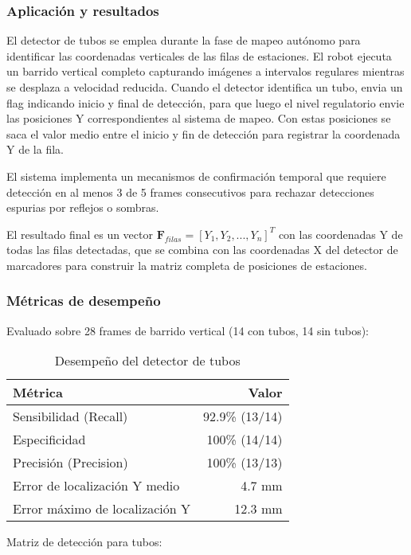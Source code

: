 \subsubsection{Aplicación y resultados}

El detector de tubos se emplea durante la fase de mapeo autónomo para identificar las coordenadas verticales de las filas de estaciones. El robot ejecuta un barrido vertical completo capturando imágenes a intervalos regulares mientras se desplaza a velocidad reducida. Cuando el detector identifica un tubo, envia un flag indicando inicio y final de detección, para que luego el nivel regulatorio envie las posiciones Y correspondientes al sistema de mapeo. Con estas posiciones se saca el valor medio entre el inicio y fin de detección para registrar la coordenada Y de la fila.

El sistema implementa un mecanismos de confirmación temporal que requiere detección en al menos 3 de 5 frames consecutivos para rechazar detecciones espurias por reflejos o sombras.

El resultado final es un vector $\mathbf{F}_{filas} = [Y_1, Y_2, ..., Y_n]^T$ con las coordenadas Y de todas las filas detectadas, que se combina con las coordenadas X del detector de marcadores para construir la matriz completa de posiciones de estaciones.
\subsubsection{Métricas de desempeño}
Evaluado sobre 28 frames de barrido vertical (14 con tubos, 14 sin tubos):

\begin{table}[H]
\centering
\begin{tabular}{|l|r|}
\hline
\textbf{Métrica} & \textbf{Valor} \\ \hline
Sensibilidad (Recall) & 92.9\% (13/14) \\ \hline
Especificidad & 100\% (14/14) \\ \hline
Precisión (Precision) & 100\% (13/13) \\ \hline
Error de localización Y medio & 4.7 mm \\ \hline
Error máximo de localización Y & 12.3 mm \\ \hline
\end{tabular}
\caption{Desempeño del detector de tubos}
\label{tab:metricas_tubos}
\end{table}

Matriz de detección para tubos:


